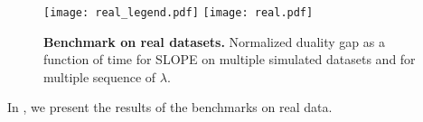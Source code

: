 \begin{figure*}[!t]
  \centering
  \texttt{[image: real\_legend.pdf]}
  \texttt{[image: real.pdf]}
  \caption{\textbf{Benchmark on real datasets.} Normalized duality gap as a function of time for SLOPE on multiple simulated datasets and for multiple sequence of $\lambda$.}
  \label{fig:real}
\end{figure*}

In , we present the results of the benchmarks on real data.
